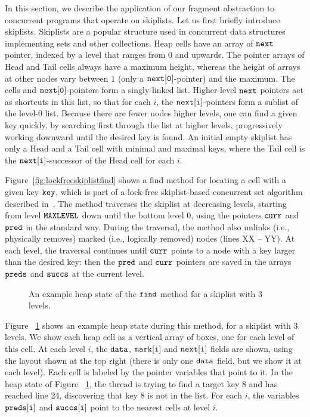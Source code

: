 In this section, we describe the application of our fragment abstraction to concurrent programs that operate on skiplists. Let us first briefly introduce skiplists. Skiplists are a popular structure used in concurrent data structures
implementing sets and other collections.
Heap cells have an array of $\tt next$ pointer, indexed by a level that ranges
from $0$ and upwards. The pointer arrays of Head and Tail cells always have
a maximum height, whereas the height of arrays at other nodes vary between $1$
(only a $\tt next[0]$-pointer) and the maximum. The cells and $\tt next[0]$-pointers form a singly-linked
list. Higher-level $\tt next$ pointers act as shortcuts in this list, so that
for each $i$, the $\tt next[i]$-pointers form a sublist of the level-$0$ list.
Because there are fewer nodes higher levels, one can find a given key quickly,
by searching first through the list at higher levels,
progressively working downward until the desired key is found.
An initial empty skiplist has only a Head and a Tail cell with minimal and
maximal keys, where 
the Tail cell is the $\tt next[i]$-successor of the Head cell for each $i$.

Figure~\ref{fig:lockfreeskiplistfind} shows a find method for locating
a cell with a given key $\tt key$, which is part of a lock-free skiplist-based concurrent set algorithm described in~\cite{ArtOfMpP}.
The method traverses the skiplist at decreasing levels, starting from
level $\tt MAXLEVEL$ down until the bottom level $0$, using the pointers
$\tt curr$ and $\tt pred$ in the standard way.
During the traversal, the method also unlinks (i.e., physically removes)
marked (i.e., logically removed) nodes (lines XX -- YY).
At each level, the traversal continues until $\tt curr$ points to a node
with a key larger than the desired key: then the $\tt pred$ and $\tt curr$ pointers are saved in the arrays $\tt preds$ and $\tt succs$ at the current level.
 \begin{figure}  
   
 \caption{An example heap state of the $\tt find$ method for a skiplist with 3 levels.}
 \label{skiplistshape}
\end{figure}
Figure ~\ref{skiplistshape} shows an example heap state during this method, for
a skiplist with 3 levels. We show each heap cell as a vertical array of
boxes, one for each level of this cell. At each level $i$, the $\tt data$,
$\tt mark[i]$ and $\tt next[i]$ fields are shown, using the layout shown at the top right (there is only one $\tt data$ field, but we show it at each level).
Each cell is labeled by the pointer variables that point to it.
In the heap state of Figure ~\ref{skiplistshape}, the thread is trying to find a target key $8$ and has reached line 24, discovering that key $8$ is not in the list.
For each $i$, the variables $\tt preds[i]$ and $\tt succs[i]$ point to the nearest cells at level $i$.

